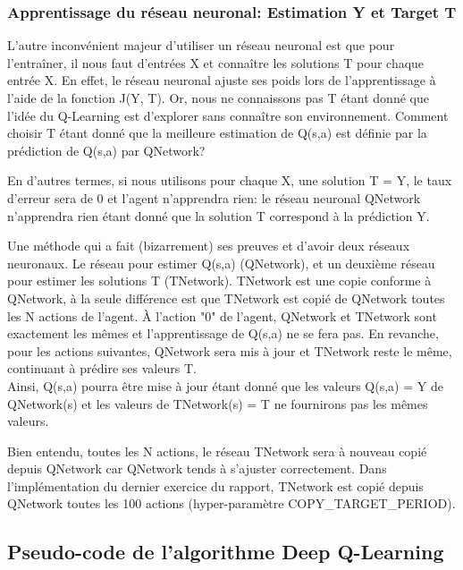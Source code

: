 \documentclass[11pt,a4paper]{report}
\begin{document}
  \subsubsection{Apprentissage du réseau neuronal: Estimation Y et Target T}
  
    \par L'autre inconvénient majeur d'utiliser un réseau neuronal est que pour l’entraîner, il nous faut d'entrées X et connaître les solutions T pour chaque entrée X. En effet, le réseau neuronal ajuste ses poids lors de l'apprentissage à l'aide de la fonction J(Y, T). Or, nous ne connaissons pas T étant donné que l'idée du Q-Learning est d'explorer sans connaître son environnement. Comment choisir T étant donné que la meilleure estimation de Q(s,a) est définie par la prédiction de Q(s,a) par QNetwork? 
    
    \par En d'autres termes, si nous utilisons pour chaque X, une solution T = Y, le taux d'erreur sera de 0 et l'agent n'apprendra rien: le réseau neuronal QNetwork n'apprendra rien étant donné que la solution T correspond à la prédiction Y. 
    
    \par Une méthode qui a fait (bizarrement) ses preuves et d'avoir deux réseaux neuronaux. Le réseau pour estimer Q(s,a) (QNetwork), et un deuxième réseau pour estimer les solutions T (TNetwork). TNetwork est une copie conforme à QNetwork, à la seule différence est que TNetwork est copié de QNetwork toutes les N actions de l'agent. À l'action "0" de l'agent, QNetwork et TNetwork sont exactement les mêmes et l'apprentissage de Q(s,a) ne se fera pas. En revanche, pour les actions suivantes, QNetwork sera mis à jour et TNetwork reste le même, continuant à prédire ses valeurs T. \\
    Ainsi, Q(s,a) pourra être mise à jour étant donné que les valeurs Q(s,a) = Y de QNetwork(s) et les valeurs de TNetwork(s) = T ne fournirons pas les mêmes valeurs. 
    
    \par Bien entendu, toutes les N actions, le réseau TNetwork sera à nouveau copié depuis QNetwork car QNetwork tends à s'ajuster correctement. Dans l'implémentation du dernier exercice du rapport, TNetwork est copié depuis QNetwork toutes les 100 actions (hyper-paramètre COPY\_TARGET\_PERIOD). 
    
   \subsection{Pseudo-code de l'algorithme Deep Q-Learning} 
   
\end{document}
